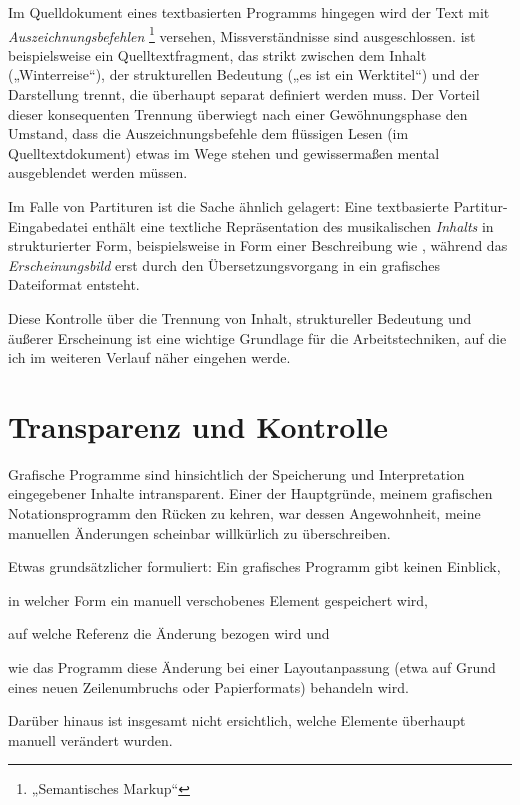 \documentclass[DIV=12]{scrreprt}
\begin{document}
Im Quelldokument eines textbasierten Programms hingegen wird der Text mit \emph{Auszeichnungsbefehlen}%
\footnote{„Semantisches Markup“}
versehen, Missverständnisse sind ausgeschlossen.
 ist beispielsweise ein Quelltextfragment, das strikt zwischen dem Inhalt („Winterreise“), der strukturellen Bedeutung („es ist ein Werktitel“) und der Darstellung trennt, die überhaupt separat definiert werden muss.
Der Vorteil dieser konsequenten Trennung überwiegt nach einer Gewöhnungsphase den Umstand, dass die Auszeichnungsbefehle dem flüssigen Lesen (im Quelltextdokument) etwas im Wege stehen und gewissermaßen mental ausgeblendet werden müssen.

Im Falle von Partituren ist die Sache ähnlich gelagert:
Eine textbasierte Partitur-Eingabedatei enthält eine textliche Repräsentation des musikalischen \emph{Inhalts} in strukturierter Form, beispielsweise in Form einer Beschreibung wie ,
während das \emph{Erscheinungsbild} erst durch den Übersetzungsvorgang in ein grafisches Dateiformat entsteht.

Diese Kontrolle über die Trennung von Inhalt, struktureller Bedeutung und äußerer Erscheinung ist eine wichtige Grundlage für die Arbeitstechniken, auf die ich im weiteren Verlauf näher eingehen werde.

\section{Transparenz und Kontrolle}
\label{sec:pt_transparency-and-control}
Grafische Programme sind hinsichtlich der Speicherung und Interpretation eingegebener Inhalte intransparent.
Einer der Hauptgründe, meinem grafischen Notationsprogramm den Rücken zu kehren, war dessen Angewohnheit, meine manuellen Änderungen scheinbar willkürlich zu überschreiben.

Etwas grundsätzlicher formuliert: Ein grafisches Programm gibt keinen Einblick, 
\begin{inparaenum}[1)]
\item in welcher Form ein manuell verschobenes Element gespeichert wird,
\item auf welche Referenz die Änderung bezogen wird und
\item wie das Programm diese Änderung bei einer Layoutanpassung (etwa auf Grund eines neuen Zeilenumbruchs oder Papierformats) behandeln wird.
\end{inparaenum}
Darüber hinaus ist insgesamt nicht ersichtlich, welche Elemente überhaupt manuell verändert wurden.
\end{document}
